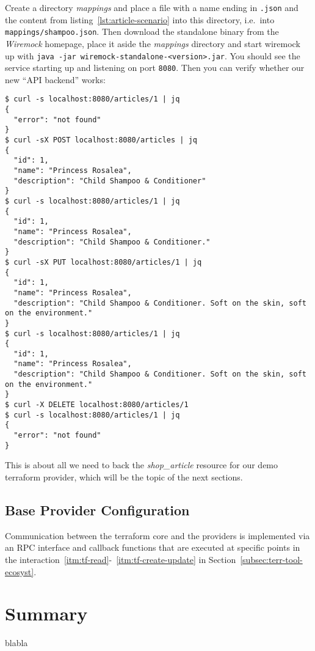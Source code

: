 \documentclass[paper=a4,fontsize=10pt,toc=listof,numbers=noenddot]{article}
\begin{document}
Create a directory \emph{mappings} and place a file with a name ending in \verb'.json' and the content from listing~\ref{lst:article-scenario} into this directory, i.e.~into \verb'mappings/shampoo.json'. Then download the standalone binary from the \emph{Wiremock} homepage, place it aside the \emph{mappings} directory and start wiremock up with \verb'java -jar wiremock-standalone-<version>.jar'. You should see the service starting up and listening on port \verb'8080'. Then you can verify whether our new ``API backend'' works:

\begin{lstlisting}[basicstyle=\ttfamily\footnotesize,numbers=none]
$ curl -s localhost:8080/articles/1 | jq
{
  "error": "not found"
}
$ curl -sX POST localhost:8080/articles | jq
{
  "id": 1,
  "name": "Princess Rosalea",
  "description": "Child Shampoo & Conditioner"
}
$ curl -s localhost:8080/articles/1 | jq
{
  "id": 1,
  "name": "Princess Rosalea",
  "description": "Child Shampoo & Conditioner."
}
$ curl -sX PUT localhost:8080/articles/1 | jq
{
  "id": 1,
  "name": "Princess Rosalea",
  "description": "Child Shampoo & Conditioner. Soft on the skin, soft on the environment."
}
$ curl -s localhost:8080/articles/1 | jq
{
  "id": 1,
  "name": "Princess Rosalea",
  "description": "Child Shampoo & Conditioner. Soft on the skin, soft on the environment."
}
$ curl -X DELETE localhost:8080/articles/1
$ curl -s localhost:8080/articles/1 | jq
{
  "error": "not found"
}
\end{lstlisting}

This is about all we need to back the \emph{shop\_article} resource for our demo terraform provider, which will be the topic of the next sections.

\subsection{Base Provider Configuration}
\label{subsec:base-prov-conf}



Communication between the terraform core and the providers is implemented via an RPC interface and callback functions that are executed at specific points in the interaction~\ref{itm:tf-read}-~\ref{itm:tf-create-update} in Section~\ref{subsec:terr-tool-ecosyst}.



\section{Summary}

blabla

\printbibliography
\end{document}
